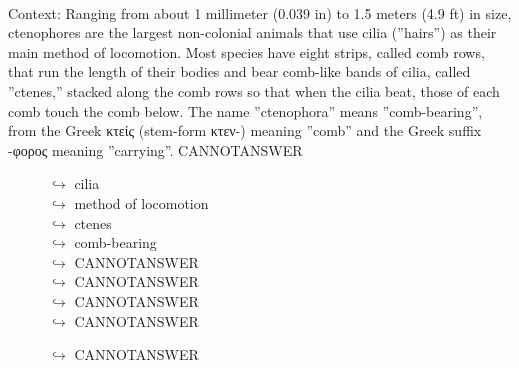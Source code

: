 \documentclass[11pt,a4paper, onecolumn]{article}
\begin{document}
\\ Context: Ranging from about 1 millimeter (0.039 in) to 1.5 meters (4.9 ft) in size, ctenophores are the largest non-colonial animals that use cilia (''hairs'') as their main method of locomotion. Most species have eight strips, called comb rows, that run the length of their bodies and bear comb-like bands of cilia, called ''ctenes,'' stacked along the comb rows so that when the cilia beat, those of each comb touch the comb below. The name ''ctenophora'' means ''comb-bearing'', from the Greek κτείς (stem-form κτεν-) meaning ''comb'' and the Greek suffix -φορος meaning ''carrying''. CANNOTANSWER

\begin{figure}[t] \small \begin{tcolorbox}[boxsep=0pt,left=5pt,right=0pt,top=2pt,colback = yellow!5] \begin{dialogue}
 \small 
\colorbox{pink!25}{$\hookrightarrow$}
{ cilia }
\\
\colorbox{pink!25}{$\hookrightarrow$}
{ method of locomotion }
\\
\colorbox{pink!25}{$\hookrightarrow$}
{ ctenes }
\\
\colorbox{pink!25}{$\hookrightarrow$}
{ comb-bearing }
\\
\colorbox{pink!25}{$\hookrightarrow$}
{ CANNOTANSWER }
\\
\colorbox{pink!25}{$\hookrightarrow$}
{ CANNOTANSWER }
\\
\colorbox{pink!25}{$\hookrightarrow$}
{ CANNOTANSWER }
\\
\colorbox{pink!25}{$\hookrightarrow$}
{ CANNOTANSWER }
 \end{dialogue}\end{tcolorbox}\end{figure}\begin{figure}[t] \small \begin{tcolorbox}[boxsep=0pt,left=5pt,right=0pt,top=2pt,colback = yellow!5] \begin{dialogue}
 \small 
\colorbox{pink!25}{$\hookrightarrow$}
{ CANNOTANSWER }
\\
 \end{dialogue}\end{tcolorbox}\end{figure}
\end{document}
